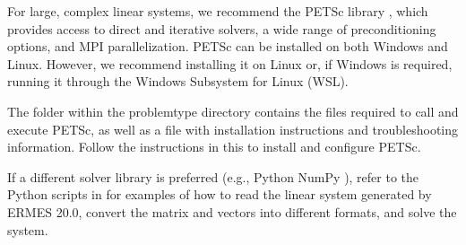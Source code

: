 For large, complex linear systems, we recommend the PETSc library \cite{PETScWeb}, which provides access to direct and iterative solvers, a wide range of preconditioning options, and MPI parallelization. PETSc can be installed on both Windows and Linux. However, we recommend installing it on Linux or, if Windows is required, running it through the Windows Subsystem for Linux (WSL).

The folder  within the problemtype directory contains the files required to call and execute PETSc, as well as a  file with installation instructions and troubleshooting information. Follow the instructions in this  to install and configure PETSc.

If a different solver library is preferred (e.g., Python NumPy \cite{NumPyWeb}), refer to the Python scripts in  for examples of how to read the linear system generated by ERMES 20.0, convert the matrix and vectors into different formats, and solve the system.